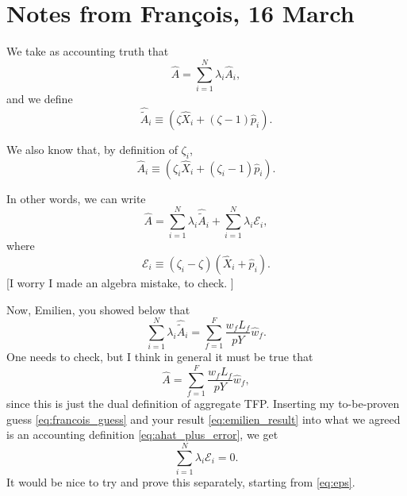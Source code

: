 \documentclass[11pt]{article}
\begin{document}
\section{Notes from Fran\c{c}ois, 16 March}

We take as accounting truth that
\[
    \hat{A} = \sum_{i=1}^N \lambda_i \hat{A}_i,
\]
and we define
\[
\hat{\tilde{A}}_i \equiv \left(\zeta\hat{X}_i+(\zeta - 1) \hat{p}_i\right).
\]

We also know that, by definition of $\zeta_i$,
\[
\hat{A}_i \equiv \left(\zeta_i \hat{X}_i+(\zeta_i - 1) \hat{p}_i\right).
\]

In other words, we can write
\begin{equation}
\hat{A}   = \sum_{i=1}^N \lambda_i \hat{\tilde{A}}_i + \sum_{i=1}^N \lambda_i \mathcal{E}_i,
\label{eq:ahat_plus_error}
\end{equation}
where
\begin{equation}
\mathcal{E}_i \equiv  (\zeta_i - \zeta) \left( \hat{X}_i + \hat{p}_i\right).
\label{eq:eps}
\end{equation}
[I worry I made an algebra mistake, to check. ]


Now, Emilien, you showed below that 
\begin{equation}
\sum_{i=1}^N \lambda_i \hat{\tilde{A}}_i = \sum_{f=1}^F \frac{w_fL_{f}}{pY}\hat{w}_f.
\label{eq:emilien_result}
\end{equation}
One needs to check, but I think in general it must be true that
\begin{equation}
\hat{A} = \sum_{f=1}^F \frac{w_fL_{f}}{pY}\hat{w}_f,
\label{eq:francois_guess}
\end{equation}
since this is just the dual definition of aggregate TFP. Inserting my to-be-proven guess \eqref{eq:francois_guess} and your result \ref{eq:emilien_result} into what we agreed is an accounting definition \eqref{eq:ahat_plus_error}, we get
\[
\sum_{i=1}^N \lambda_i \mathcal{E}_i = 0.
\]
It would be nice to try and prove this separately, starting from \eqref{eq:eps}.

\\
\end{document}
